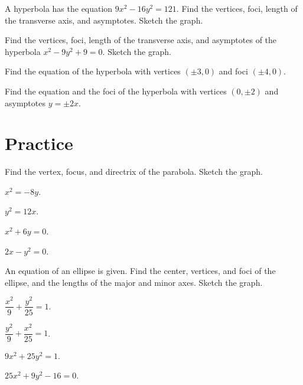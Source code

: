 \begin{example}
    A hyperbola has the equation $9x^2-16y^2=121$.
    Find the vertices, foci, length of the transverse axis, and asymptotes. Sketch the graph.
\end{example}
\vspace*{8\baselineskip}

\begin{example}
    Find the vertices, foci, length of the transverse axis, and asymptotes of the hyperbola $x^2-9y^2+9=0$. Sketch the graph.
\end{example}
\vspace*{8\baselineskip}

\begin{example}
    Find the equation of the hyperbola with vertices $(\pm 3, 0)$ and foci $(\pm 4, 0)$.
\end{example}
\vspace*{8\baselineskip}

\begin{example}
    Find the equation and the foci of the hyperbola with vertices $(0,\pm 2)$ and asymptotes $y=\pm2x$.
\end{example}
\vspace*{8\baselineskip}

\section*{Practice}

\begin{exercise}
    Find the vertex, focus, and directrix of the parabola. Sketch the graph.\\
    \begin{enumerate*}
        \item $x^2=-8y$.
        \item $y^2=12x$.
        \item $x^2+6y=0$.
        \item $2x-y^2=0$.
    \end{enumerate*}
\end{exercise}
\vspace*{10\baselineskip}

\begin{exercise}
    An equation of an ellipse is given. Find the center, vertices, and foci of the ellipse, and the lengths of the major and minor axes. Sketch the graph.\\
    \begin{enumerate*}
        \item $\dfrac{x^2}{9}+\dfrac{y^2}{25}=1$.
        \item $\dfrac{y^2}{9}+\dfrac{x^2}{25}=1$.
        \item $9x^2+25y^2=1$.
        \item $25x^2+9y^2-16=0$.
    \end{enumerate*}
\end{exercise}
\vspace*{10\baselineskip}

